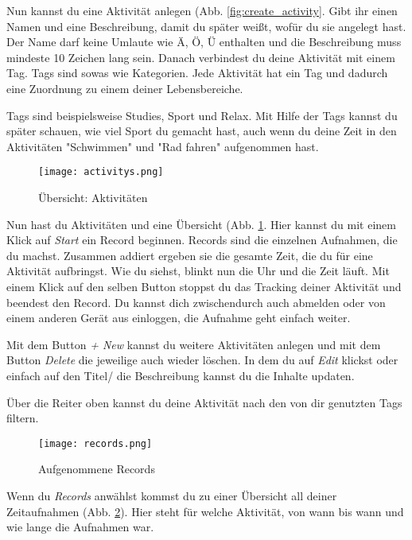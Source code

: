 Nun kannst du eine Aktivität anlegen (Abb. \ref{fig:create_activity}. 
Gibt ihr einen Namen und eine Beschreibung, damit du später weißt, wofür du sie angelegt hast. 
Der Name darf keine Umlaute wie \glqq Ä, Ö, Ü\grqq{}  enthalten und die Beschreibung muss mindeste 10 Zeichen lang sein. 
Danach verbindest du deine Aktivität mit einem Tag. Tags sind sowas wie Kategorien. 
Jede Aktivität hat ein Tag und dadurch eine Zuordnung zu einem deiner Lebensbereiche. 

Tags sind beispielsweise Studies, Sport und Relax. 
Mit Hilfe der Tags kannst du später schauen, wie viel Sport du gemacht hast, auch wenn du deine Zeit in den Aktivitäten "Schwimmen" und "Rad fahren" aufgenommen hast. 


\begin{figure}[H]
	\hspace{-1.5cm}
	\centering
	\texttt{[image: activitys.png]}
	\caption{Übersicht: Aktivitäten}
	\label{fig:activitys}
\end{figure}

Nun hast du Aktivitäten und eine Übersicht (Abb. \ref{fig:activitys}. Hier kannst du mit einem Klick auf  \textit{Start}  ein Record beginnen. Records sind die einzelnen Aufnahmen, die du machst. Zusammen addiert ergeben sie die gesamte Zeit, die du für eine Aktivität aufbringst. Wie du siehst, blinkt nun die Uhr und die Zeit läuft. 
Mit einem Klick auf den selben Button stoppst du das Tracking deiner Aktivität und beendest den Record. Du kannst dich zwischendurch auch abmelden oder von einem anderen Gerät aus einloggen, die Aufnahme geht einfach weiter. 

Mit dem Button \textit{+ New} kannst du weitere Aktivitäten anlegen und mit dem Button \textit{Delete} die jeweilige auch wieder löschen. In dem du auf \textit{Edit} klickst oder einfach auf den Titel/ die Beschreibung kannst du die Inhalte updaten. 

Über die Reiter oben kannst du deine Aktivität nach den von dir genutzten Tags filtern. 

\begin{figure}[H]
	\hspace{-1.5cm}
	\centering
	\texttt{[image: records.png]}
	\caption{Aufgenommene Records}
	\label{fig:records}
\end{figure}

Wenn du \textit{Records} anwählst kommst du zu einer Übersicht all deiner Zeitaufnahmen (Abb. \ref{fig:records}). Hier steht für welche Aktivität, von wann bis wann und wie lange die Aufnahmen war. 

